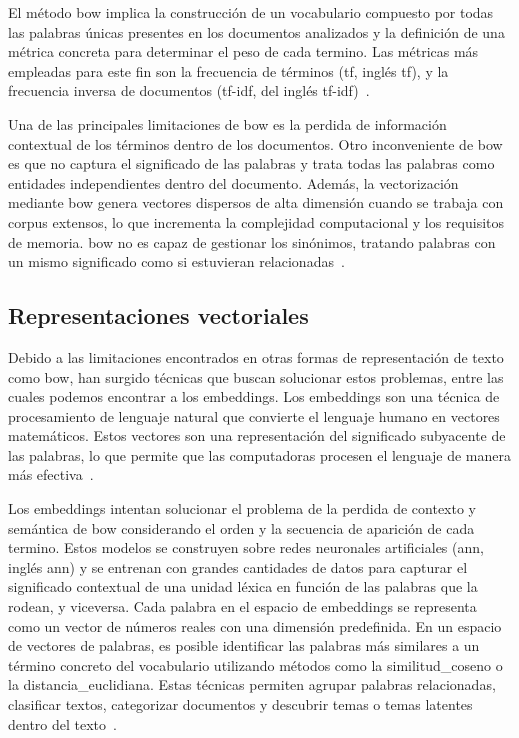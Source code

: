 El método \acrshort{bow} implica la construcción de un vocabulario compuesto
por todas las palabras únicas presentes en los documentos analizados y la
definición de una métrica concreta para determinar el peso de cada termino. Las
métricas más empleadas para este fin son la frecuencia de términos
(\acrshort{tf}, inglés \acrlong{tf}), y la frecuencia inversa de documentos
(\acrshort{tf-idf}, del inglés
\acrlong{tf-idf})~\cite{hankarComprehensiveOverviewTopic2025}.

Una de las principales limitaciones de \acrshort{bow} es la perdida de
información contextual de los términos dentro de los documentos. Otro
inconveniente de \acrshort{bow} es que no captura el significado de las
palabras y trata todas las palabras como entidades independientes dentro del
documento. Además, la vectorización mediante \acrshort{bow} genera vectores
dispersos de alta dimensión cuando se trabaja con \gls{corpus} extensos, lo que
incrementa la complejidad computacional y los requisitos de memoria.
\acrshort{bow} no es capaz de gestionar los sinónimos, tratando palabras con un
mismo significado como si estuvieran
relacionadas~\cite{hankarComprehensiveOverviewTopic2025}.

\subsection{Representaciones vectoriales}

Debido a las limitaciones encontrados en otras formas de representación de
texto como \acrshort{bow}, han surgido técnicas que buscan solucionar estos
problemas, entre las cuales podemos encontrar a los \gls{embeddings}. Los
\gls{embeddings} son una técnica de procesamiento de lenguaje natural que
convierte el lenguaje humano en vectores matemáticos. Estos vectores son una
representación del significado subyacente de las palabras, lo que permite que
las computadoras procesen el lenguaje de manera más
efectiva~\cite{espindolaQueSonEmbeddings2023}.

Los \gls{embeddings} intentan solucionar el problema de la perdida de contexto
y semántica de \acrshort{bow} considerando el orden y la secuencia de aparición
de cada termino. Estos modelos se construyen sobre redes neuronales
artificiales (\acrshort{ann}, inglés \acrlong{ann}) y se entrenan con grandes
cantidades de datos para capturar el significado contextual de una unidad
léxica en función de las palabras que la rodean, y viceversa. Cada palabra en
el espacio de \gls{embeddings} se representa como un vector de números reales
con una dimensión predefinida. En un espacio de vectores de palabras, es
posible identificar las palabras más similares a un término concreto del
vocabulario utilizando métodos como la \gls{similitud_coseno} o la
\gls{distancia_euclidiana}. Estas técnicas permiten agrupar palabras
relacionadas, clasificar textos, categorizar documentos y descubrir temas o
temas latentes dentro del texto~\cite{hankarComprehensiveOverviewTopic2025}.

